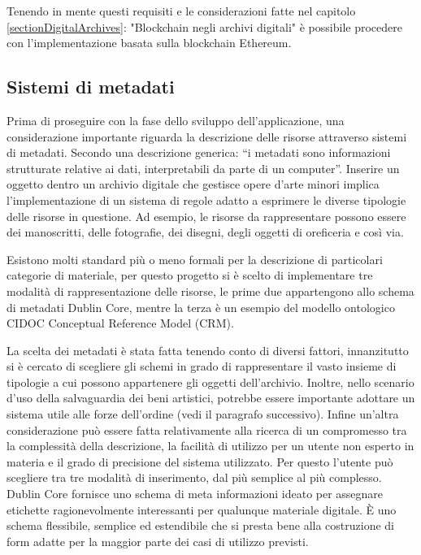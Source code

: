 Tenendo in mente questi requisiti e le considerazioni fatte nel capitolo \ref{sectionDigitalArchives}: "Blockchain negli archivi digitali" è possibile procedere con l'implementazione basata sulla blockchain Ethereum.

\subsection{Sistemi di metadati}

Prima di proseguire con la fase dello sviluppo dell'applicazione, una considerazione importante riguarda la descrizione delle risorse attraverso sistemi di metadati. Secondo una descrizione generica: “i metadati sono informazioni strutturate relative ai dati, interpretabili da parte di un computer”. Inserire un oggetto dentro un archivio digitale che gestisce opere d’arte minori implica l'implementazione di un sistema di regole adatto a esprimere le diverse tipologie delle risorse in questione. Ad esempio, le risorse da rappresentare possono essere dei manoscritti, delle fotografie, dei disegni, degli oggetti di oreficeria e così via.

Esistono molti standard più o meno formali per la descrizione di particolari categorie di materiale, per questo progetto si è scelto di implementare tre modalità di rappresentazione delle risorse, le prime due appartengono allo schema di metadati Dublin Core, mentre la terza è un esempio del modello ontologico CIDOC Conceptual Reference Model (CRM).

La scelta dei metadati è stata fatta tenendo conto di diversi fattori, innanzitutto si è cercato di scegliere gli schemi in grado di rappresentare il vasto insieme di tipologie a cui possono appartenere gli oggetti dell'archivio. Inoltre, nello scenario d'uso della salvaguardia dei beni artistici, potrebbe essere importante adottare un sistema utile alle forze dell'ordine (vedi il paragrafo successivo). Infine un’altra considerazione può essere fatta relativamente alla ricerca di un compromesso tra la complessità della descrizione, la facilità di utilizzo per un utente non esperto in materia e il grado di precisione del sistema utilizzato. Per questo l’utente può scegliere tra tre modalità di inserimento, dal più semplice al più complesso. Dublin Core fornisce uno schema di meta informazioni ideato per assegnare etichette ragionevolmente interessanti per qualunque materiale digitale. È uno schema flessibile, semplice ed estendibile che si presta bene alla costruzione di form adatte per la maggior parte dei casi di utilizzo previsti.

